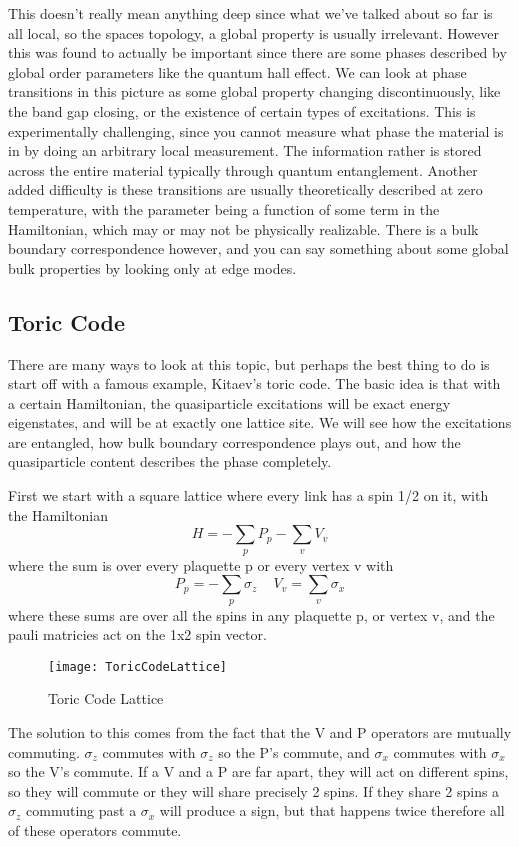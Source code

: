 	This doesn't really mean anything deep since what we've talked about so far is all local, so the spaces topology, a global property is usually irrelevant. However this was found to actually be important since there are some phases described by global order parameters like the quantum hall effect. We can look at phase transitions in this picture as some global property changing discontinuously, like the band gap closing, or the existence of certain types of excitations. This is experimentally challenging, since you cannot measure what phase the material is in by doing an arbitrary local measurement. The information rather is stored across the entire material typically through quantum entanglement. Another added difficulty is these transitions are usually theoretically described at zero temperature, with the parameter being a function of some term in the Hamiltonian, which may or may not be physically realizable. There is a bulk boundary correspondence however, and you can say something about some global bulk properties by looking only at edge modes. 

\subsection{Toric Code}

	There are many ways to look at this topic, but perhaps the best thing to do is start off with a famous example, Kitaev's toric code. The basic idea is that with a certain Hamiltonian, the quasiparticle excitations will be exact energy eigenstates, and will be at exactly one lattice site. We will see how the excitations are entangled, how bulk boundary correspondence plays out, and how the quasiparticle content describes the phase completely.
	
	First we start with a square lattice where every link has a spin 1/2 on it, with the Hamiltonian 
	\[H = -\sum_pP_p-\sum_vV_v \]
	where the sum is over every plaquette p or every vertex v with 
	\[P_p = -\sum_p\sigma_z\,\quad V_v=\sum_v\sigma_x \] where these sums are over all the spins in any plaquette p, or vertex v, and the pauli matricies act on the 1x2 spin vector.
	\begin{figure}
		\centering
		\texttt{[image: ToricCodeLattice]}
		\caption{Toric Code Lattice}
		\label{fig:toriccodelattice}
	\end{figure}
	
	The solution to this comes from the fact that the V and P operators are mutually commuting. $\sigma_z$ commutes with $\sigma_z$ so the P's commute, and $\sigma_x$ commutes with $\sigma_x$ so the V's commute. If a V and a P are far apart, they will act on different spins, so they will commute or they will share precisely 2 spins. If they share 2 spins a $\sigma_z$ commuting past a $\sigma_x$ will produce a sign, but that happens twice therefore all of these operators commute.
		
